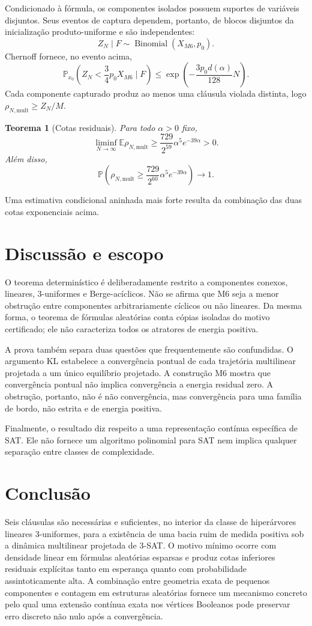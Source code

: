 \documentclass[11pt,a4paper]{article}
\newtheorem{theorem}{Teorema}[section]
\begin{document}
Condicionado à fórmula, os componentes isolados possuem suportes de variáveis disjuntos. Seus eventos de captura dependem, portanto, de blocos disjuntos da inicialização produto-uniforme e são independentes:
\[
Z_N\mid F\sim\operatorname{Binomial}(X_{M6},p_0).
\]
Chernoff fornece, no evento acima,
\[
\mathbb P_{x_0}\!\left(Z_N<\frac34p_0X_{M6}\mid F\right)
\le\exp\!\left(-\frac{3p_0d(\alpha)}{128}N\right).
\]
Cada componente capturado produz ao menos uma cláusula violada distinta, logo $\rho_{N,\mathrm{mult}}\ge Z_N/M$.

\begin{theorem}[Cotas residuais]
Para todo $\alpha>0$ fixo,
\[
\liminf_{N\to\infty}\mathbb E\rho_{N,\mathrm{mult}}
\ge\frac{729}{2^{59}}\alpha^5e^{-39\alpha}>0.
\]
Além disso,
\[
\mathbb P\!\left(\rho_{N,\mathrm{mult}}\ge\frac{729}{2^{60}}\alpha^5e^{-39\alpha}\right)\longrightarrow1.
\]
\end{theorem}
Uma estimativa condicional aninhada mais forte resulta da combinação das duas cotas exponenciais acima.

\section{Discussão e escopo}
O teorema determinístico é deliberadamente restrito a componentes conexos, lineares, 3-uniformes e Berge-acíclicos. Não se afirma que M6 seja a menor obstrução entre componentes arbitrariamente cíclicos ou não lineares. Da mesma forma, o teorema de fórmulas aleatórias conta cópias isoladas do motivo certificado; ele não caracteriza todos os atratores de energia positiva.

A prova também separa duas questões que frequentemente são confundidas. O argumento KL estabelece a convergência pontual de cada trajetória multilinear projetada a um único equilíbrio projetado. A construção M6 mostra que convergência pontual não implica convergência a energia residual zero. A obstrução, portanto, não é não convergência, mas convergência para uma família de bordo, não estrita e de energia positiva.

Finalmente, o resultado diz respeito a uma representação contínua específica de SAT. Ele não fornece um algoritmo polinomial para SAT nem implica qualquer separação entre classes de complexidade.

\section{Conclusão}
Seis cláusulas são necessárias e suficientes, no interior da classe de hiperárvores lineares 3-uniformes, para a existência de uma bacia ruim de medida positiva sob a dinâmica multilinear projetada de 3-SAT. O motivo mínimo ocorre com densidade linear em fórmulas aleatórias esparsas e produz cotas inferiores residuais explícitas tanto em esperança quanto com probabilidade assintoticamente alta. A combinação entre geometria exata de pequenos componentes e contagem em estruturas aleatórias fornece um mecanismo concreto pelo qual uma extensão contínua exata nos vértices Booleanos pode preservar erro discreto não nulo após a convergência.
\end{document}
